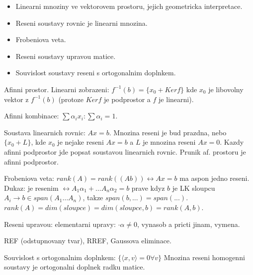 \begin{itemize}
\item Linearni mnoziny ve vektorovem prostoru, jejich geometricka interpretace.
\item Reseni soustavy rovnic je linearni mnozina.
\item Frobeniova veta.
\item Reseni soustavy upravou matice.
\item Souvislost soustavy reseni s ortogonalnim doplnkem.
\end{itemize}

Afinni prostor. Linearni zobrazeni: $f^{-1}(b)=\{x_0+Ker f\}$ kde $x_0$
je libovolny vektor z $f^{-1}(b)$ (protoze $Ker f$ je podprostor a $f$ je
linearni).

Afinni kombinace: $\sum\alpha_i x_i: \sum\alpha_i=1$.

Soustava linearnich rovnic: $Ax=b$.
Mnozina reseni je bud prazdna, nebo $\{x_0+L\}$, kde $x_0$ je nejake reseni
$Ax=b$ a $L$ je mnozina reseni $Ax=0$.
Kazdy afinni podprostor jde popsat soustavou linearnich rovnic.
Prunik af. prostoru je afinni podprostor.

Frobeniova veta: $rank(A)=rank((A b)) \leftrightarrow Ax=b$ ma aspon jedno
reseni. Dukaz: je resenim $\leftrightarrow A_1\alpha_1+\ldots A_n\alpha_2=b$
prave kdyz $b$ je LK sloupcu $A_i\rightarrow b\in span(A_1\ldots A_n)$,
takze $span(b,...)=span(...)$. $rank(A)=dim(sloupce)=dim(sloupce,b)=rank(A,b)$.

Reseni upravou: elementarni upravy: $\cdot\alpha\neq 0$, vynasob a pricti jinam,
vymena.

REF (odstupnovany tvar), RREF, Gaussova eliminace.

Souvislost s ortogonalnim doplnkem: $\{\langle x,v\rangle=0 \forall v\}$
Mnozina reseni homogenni soustavy je ortogonalni doplnek radku matice.
